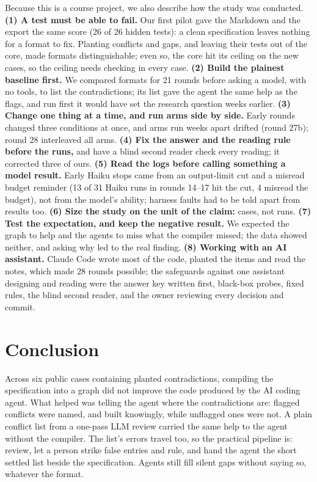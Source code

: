\documentclass{article}
\begin{document}
Because this is a course project, we also describe how the study was conducted.
\textbf{(1) A test must be able to fail.} Our first pilot gave the Markdown and the export the same score
(26 of 26 hidden tests): a clean specification leaves nothing for a format to fix. Planting conflicts and
gaps, and leaving their tests out of the core, made formats distinguishable; even so, the core hit its
ceiling on the new cases, so the ceiling needs checking in every case.
\textbf{(2) Build the plainest baseline first.} We compared formats for 21 rounds before asking a model,
with no tools, to list the contradictions; its list gave the agent the same help as the flags, and run
first it would have set the research question weeks earlier.
\textbf{(3) Change one thing at a time, and run arms side by side.} Early rounds changed three conditions
at once, and arms run weeks apart drifted (round 27b); round 28 interleaved all arms.
\textbf{(4) Fix the answer and the reading rule before the runs,} and have a blind second reader check
every reading; it corrected three of ours.
\textbf{(5) Read the logs before calling something a model result.} Early Haiku stops came from an
output-limit cut and a misread budget reminder (13 of 31 Haiku runs in rounds 14--17 hit the cut, 4
misread the budget), not from the model's ability; harness faults had to be told apart from results too.
\textbf{(6) Size the study on the unit of the claim:} cases, not runs.
\textbf{(7) Test the expectation, and keep the negative result.} We expected the graph to help and the
agents to miss what the compiler missed; the data showed neither, and asking why led to the real finding.
\textbf{(8) Working with an AI assistant.} Claude Code wrote most of the code, planted the items and read the
notes, which made 28 rounds possible; the safeguards against one assistant designing and reading were the
answer key written first, black-box probes, fixed rules, the blind second reader, and the owner reviewing
every decision and commit.

\section{Conclusion}

Across six public cases containing planted contradictions, compiling the specification into a graph did not improve the code produced by the AI coding agent. What helped was telling the agent where the contradictions are: flagged
conflicts were named, and built knowingly, while unflagged ones were not. A plain conflict list from a
one-pass LLM review carried the same help to the agent without the compiler. The
list's errors travel too, so the practical pipeline is: review, let a person strike false entries and
rule, and hand the agent the short settled list beside the specification. Agents still fill silent gaps
without saying so, whatever the format.
\end{document}
